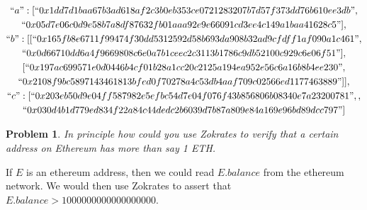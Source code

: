 \documentclass[12pt,letterpaper]{article}
\theoremstyle{plain}
\newtheorem{prb}{Problem}
\theoremstyle{definition}
\begin{document}
\begin{gather*}
    ``a": [``0x1dd7d1baa67b3ad618af2c3b0eb353ce0721283207b7d57f373dd76b610ee3db",\\
    ``0x05d7e06c0d9e58b7a8df87632fb01aaa92e9e66091cd3ee4c149a1baa41628c5"],\\
    ``b": [[``0x165fb8e6711f99474f30dd5312592d58b693da908b32ad9cfdff1af090a1c461",\\
    ``0x0d66710dd6a4f9669808c6e0a7b1ceec2c3113b1786c9db52100c929c6e06f51"],\\
    [``0x197ac699571e0d0446b4cf01b28a1cc20c2125a194ea952e56c6a16b8b4ee230",\\
    ``0x2108f9bc5897143461813bfed0f70278a4c53db4aaf709c02566ed1177463889"]],\\
    ``c": [``0x203eb50d9e04ff587982e5efbc54d7e04f076f43b856806b08340e7a23200781",,\\
    ``0x030d4b1d779ed834f22a84c44dedc2b6039d7b87a809e84a169e96bd89dcc797"]
    \end{gather*}
\begin{prb}\label{P4}
In principle how could you use Zokrates to verify that a certain address on Ethereum has more than say 1 ETH.
\end{prb}

If $E$ is an ethereum address, then we could read $E.balance$ from the ethereum network. We would then use Zokrates to assert that $E.balance>1000000000000000000$.
\end{document}
